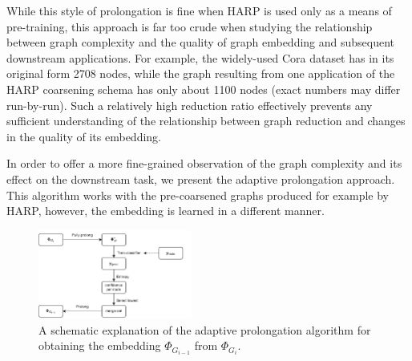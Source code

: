 While this style of prolongation is fine when HARP is used only as a means of pre-training, this approach is far too crude when studying the relationship between graph complexity and the quality of graph embedding and subsequent downstream applications. For example, the widely-used Cora dataset \cite{yang_revisiting_2016} has in its original form 2708 nodes, while the graph resulting from one application of the HARP coarsening schema has only about 1100 nodes (exact numbers may differ run-by-run). Such a relatively high reduction ratio effectively prevents any sufficient understanding of the relationship between graph reduction and changes in the quality of its embedding.

In order to offer a more fine-grained observation of the graph complexity and its effect on the downstream task, we present the adaptive prolongation approach. This algorithm works with the pre-coarsened graphs produced for example by HARP, however, the embedding is learned in a different manner.

\begin{figure}
  \centering
  \includegraphics[width=0.45\textwidth]{images/adaptive-prolongation/adaptive-prolongation.pdf}
    \caption{A schematic explanation of the adaptive prolongation algorithm for obtaining the embedding \( \Phi_{G_{i - 1}} \) from \( \Phi_{G_i} \).}
  \label{fig:adaptive-prolongation}
\end{figure}

